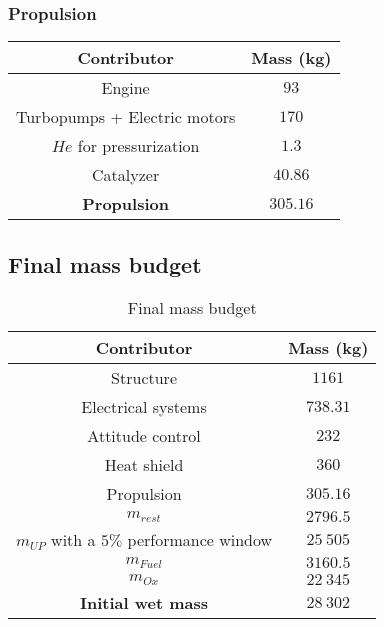 \subsubsection{Propulsion}
\begin{center}
\begin{tabular}[H]{|c|c|}
	\hline
	\cellcolor{gray!50}Contributor & \cellcolor{gray!50}Mass (kg)\\
	\hline
	Engine & $93$\\
	\hline
	Turbopumps + Electric motors & $170$\\
	\hline
	$He$ for pressurization & $1.3$\\
	\hline
	Catalyzer & $40.86$\\
	\hline
	\cellcolor{green!30}\textbf{Propulsion} & \textbf{$305.16$}\\
	\hline
\end{tabular}
\end{center}
\subsection{Final mass budget}
\begin{center}
\begin{table}
	
\begin{tabular}[H]{|c|c|}
	\hline
	\cellcolor{gray!50}Contributor & \cellcolor{gray!50}Mass (kg)\\
	\hline
	Structure & $1161$\\
	\hline
	Electrical systems & $738.31$\\
	\hline
	Attitude control & $232$\\
	\hline
	Heat shield & $360$\\
	\hline
	Propulsion & $305.16$\\
	\hline
	\cellcolor{green!30}\textbf{$m_{rest}$} & \textbf{$2796.5$}\\
	\hline
	\cellcolor{green!30}\textbf{$m_{UP}$} with a $5\%$ performance window & \textbf{$25\ 505$}\\
	\hline
	\cellcolor{green!30}\textbf{$m_{Fuel}$}  & \textbf{$3160. 5$}\\
	\hline
	\cellcolor{green!30}\textbf{$m_{Ox}$}  & \textbf{$22\ 345$}\\
	\hline
	\cellcolor{red!30}\textbf{Initial wet mass}  & \textbf{$28\ 302$}\\
	\hline
\end{tabular}
\caption{Final mass budget}
\end{table}
\end{center}
